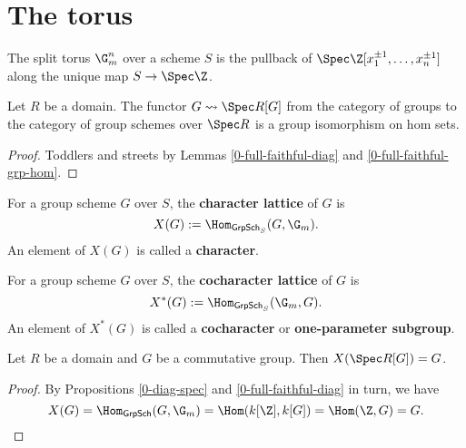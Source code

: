 \section{The torus}


\begin{definition}
  \label{0-torus}
  \leanok

  The split torus $\G_m^n$ over a scheme $S$ is the pullback of
  $\Spec \Z[x_1^{\pm 1}, \dotsc, x_n^{\pm 1}]$ along the unique map $S \to \Spec \Z$.
\end{definition}


\begin{lemma}
  \label{0-diag-hom}
  \leanok

  Let $R$ be a domain.
  The functor $G \rightsquigarrow \Spec R[G]$ from the category of groups to the category of group schemes over $\Spec R$ is a group isomorphism on hom sets.
\end{lemma}
\begin{proof}
  \leanok

  Toddlers and streets by Lemmas \ref{0-full-faithful-diag} and \ref{0-full-faithful-grp-hom}.
\end{proof}


\begin{definition}
  \label{0-char}
  \leanok

  For a group scheme $G$ over $S$, the {\bf character lattice} of $G$ is
  \[
    X(G) := \Hom_{\mathsf{GrpSch}_S}(G, \G_m).
  \]
  An element of $X(G)$ is called a {\bf character}.
\end{definition}


\begin{definition}
  \label{0-cochar}
  \leanok

  For a group scheme $G$ over $S$, the {\bf cocharacter lattice} of $G$ is
  \[
    X^*(G) := \Hom_{\mathsf{GrpSch}_S}(\G_m, G).
  \]
  An element of $X^*(G)$ is called a {\bf cocharacter} or {\bf one-parameter subgroup}.
\end{definition}


\begin{proposition}
  \label{0-char-diag}
  \leanok

  Let $R$ be a domain and $G$ be a commutative group.
  Then $X(\Spec R[G]) = G$.
\end{proposition}
\begin{proof}
  \leanok

  By Propositions \ref{0-diag-spec} and \ref{0-full-faithful-diag} in turn, we have
  \[
    X(G) = \Hom_{\mathsf{GrpSch}}(G, \G_m) = \Hom(k[\Z], k[G]) = \Hom(\Z, G) = G.
  \]
\end{proof}



